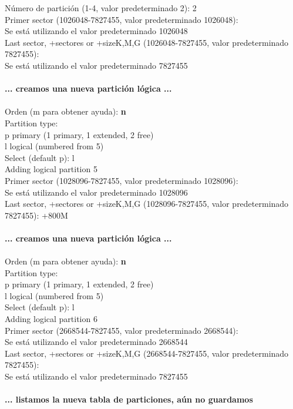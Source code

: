 \documentclass[12pt]{article}
\begin{document}
{Número de partición (1-4, valor predeterminado 2): 2\\
Primer sector (1026048-7827455, valor predeterminado 1026048): \\
Se está utilizando el valor predeterminado 1026048\\
Last sector, +sectores or +size{K,M,G} (1026048-7827455, valor predeterminado 7827455): \\
Se está utilizando el valor predeterminado 7827455\\
\\
\textbf{... creamos una nueva partición lógica ...}\\
\\
Orden (m para obtener ayuda):  {\bf n}\\
Partition type:\\
   p   primary (1 primary, 1 extended, 2 free)\\
   l   logical (numbered from 5)\\
Select (default p): l\\
Adding logical partition 5\\
Primer sector (1028096-7827455, valor predeterminado 1028096): \\
Se está utilizando el valor predeterminado 1028096\\
Last sector, +sectores or +size{K,M,G} (1028096-7827455, valor predeterminado 7827455): +800M\\
\\
\textbf{... creamos una nueva partición lógica ...}\\
\\
Orden (m para obtener ayuda):  {\bf n}\\
Partition type:\\
   p   primary (1 primary, 1 extended, 2 free)\\
   l   logical (numbered from 5)\\
Select (default p): l\\
Adding logical partition 6\\
Primer sector (2668544-7827455, valor predeterminado 2668544): \\
Se está utilizando el valor predeterminado 2668544\\
Last sector, +sectores or +size{K,M,G} (2668544-7827455, valor predeterminado 7827455): \\
Se está utilizando el valor predeterminado 7827455\\
\\
\textbf{... listamos la nueva tabla de particiones, aún no guardamos\\
}}
\end{document}
